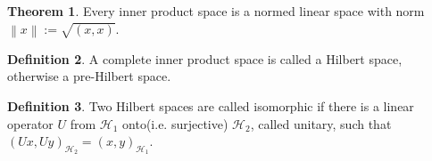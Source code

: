 \documentclass[twocolumn]{article}
\theoremstyle{definition}
\newtheorem{definition}{Definition}[section]
\newtheorem{theorem}[definition]{Theorem}
\theoremstyle{remark}
\begin{document}
\begin{theorem}
    Every inner product space is a normed linear space with norm $\left\lVert x \right\rVert := \sqrt{(x, x)}$.
\end{theorem}
\begin{definition}
    A complete inner product space is called a Hilbert space, otherwise a pre-Hilbert space.
\end{definition}
\begin{definition}
    Two Hilbert spaces are called isomorphic if there is a linear operator $U$ from $\mathcal{H}_1$ onto(i.e. surjective) $\mathcal{H}_2$, called unitary, such that
    $(Ux, Uy)_{\mathcal{H}_2} = (x, y)_{\mathcal{H}_1}$.
\end{definition}
\end{document}
